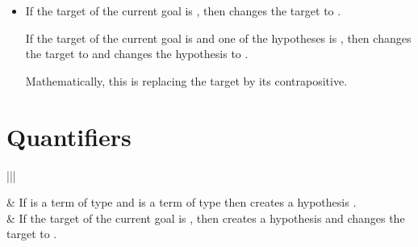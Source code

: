 \documentclass[letterpaper,10pt,english]{sphinxmanual}
\begin{document}
\begin{itemize}
\begin{itemize}
\begin{itemize}
\item {} 
\sphinxAtStartPar
If the target of the current goal is  ,
then  changes the target to  .

\sphinxAtStartPar
If the target of the current goal is 
and one of the hypotheses is ,
then  changes the target to  
and changes the hypothesis to .

\sphinxAtStartPar
Mathematically, this is replacing the target by its contrapositive.

\end{itemize}

\end{itemize}

\end{itemize}


\section{Quantifiers}
\label{\detokenize{tactics:quantifiers}}

\begin{savenotes}\sphinxattablestart
\centering
\begin{tabular}[t]{|||}
\hline

\sphinxAtStartPar
{}
&
\sphinxAtStartPar
If  is a term of type  and
 is a term of type  then
 creates a hypothesis .
\\
\hline
\sphinxAtStartPar
{}
&
\sphinxAtStartPar
If the target of the current goal is , then
 creates a hypothesis  and
changes the target to .
\\
\hline
\end{tabular}
\par
\sphinxattableend\end{savenotes}
\end{document}
